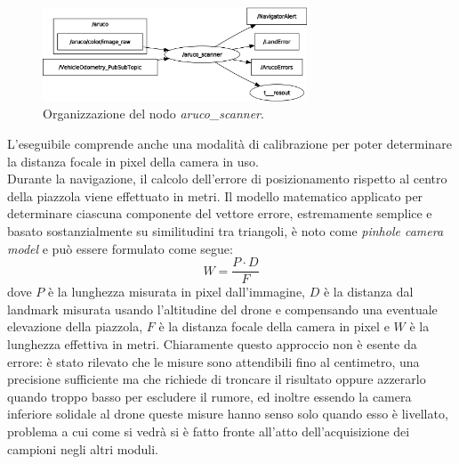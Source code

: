 \begin{figure}
    \centering
    \includegraphics[width=0.7\textwidth]{figs/chapter3/ascan.png}
    \caption{Organizzazione del nodo \emph{aruco\_scanner}.}
    \label{fig:ascan}
\end{figure}

L'eseguibile comprende anche una modalità di calibrazione per poter determinare la distanza focale in pixel della camera in uso.\\
Durante la navigazione, il calcolo dell'errore di posizionamento rispetto al centro della piazzola viene effettuato in metri. Il modello matematico applicato per determinare ciascuna componente del vettore errore, estremamente semplice e basato sostanzialmente su similitudini tra triangoli, è noto come \emph{pinhole camera model} e può essere formulato come segue:
\begin{equation}
    W = \frac{P \cdot D}{F}
\end{equation}
dove $P$ è la lunghezza misurata in pixel dall'immagine, $D$ è la distanza dal landmark misurata usando l'altitudine del drone e compensando una eventuale elevazione della piazzola, $F$ è la distanza focale della camera in pixel e $W$ è la lunghezza effettiva in metri. Chiaramente questo approccio non è esente da errore: è stato rilevato che le misure sono attendibili fino al centimetro, una precisione sufficiente ma che richiede di troncare il risultato oppure azzerarlo quando troppo basso per escludere il rumore, ed inoltre essendo la camera inferiore solidale al drone queste misure hanno senso solo quando esso è livellato, problema a cui come si vedrà si è fatto fronte all'atto dell'acquisizione dei campioni negli altri moduli.
\clearpage

